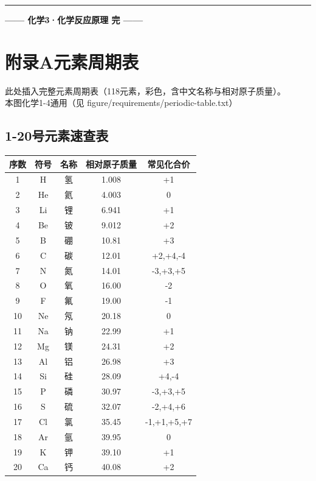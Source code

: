 \documentclass[a4paper,12pt]{ctexart}
\begin{document}
\vspace{0.5cm}
\begin{center}\rule{0.7\textwidth}{1pt}\vspace{0.4cm}
{\large\textcolor{blue!70!black}{\textbf{—— 化学3·化学反应原理 完 ——}}}
\end{center}

\newpage

\appendix
\section*{\textcolor{blue!70!black}{附录A\quad 元素周期表}}

\begin{figplaceholder}
此处插入完整元素周期表（118元素，彩色，含中文名称与相对原子质量）。\\
本图化学1-4通用（见 figure/requirements/periodic-table.txt）
\end{figplaceholder}

\subsection*{1-20号元素速查表}

\begin{center}
\begin{tabular}{|c|c|c|c|c|}
\hline
\textbf{序数} & \textbf{符号} & \textbf{名称} & \textbf{相对原子质量} & \textbf{常见化合价} \\
\hline
1 & H & 氢 & 1.008 & +1 \\
2 & He & 氦 & 4.003 & 0 \\
3 & Li & 锂 & 6.941 & +1 \\
4 & Be & 铍 & 9.012 & +2 \\
5 & B & 硼 & 10.81 & +3 \\
6 & C & 碳 & 12.01 & +2,+4,-4 \\
7 & N & 氮 & 14.01 & -3,+3,+5 \\
8 & O & 氧 & 16.00 & -2 \\
9 & F & 氟 & 19.00 & -1 \\
10 & Ne & 氖 & 20.18 & 0 \\
11 & Na & 钠 & 22.99 & +1 \\
12 & Mg & 镁 & 24.31 & +2 \\
13 & Al & 铝 & 26.98 & +3 \\
14 & Si & 硅 & 28.09 & +4,-4 \\
15 & P & 磷 & 30.97 & -3,+3,+5 \\
16 & S & 硫 & 32.07 & -2,+4,+6 \\
17 & Cl & 氯 & 35.45 & -1,+1,+5,+7 \\
18 & Ar & 氩 & 39.95 & 0 \\
19 & K & 钾 & 39.10 & +1 \\
20 & Ca & 钙 & 40.08 & +2 \\
\hline
\end{tabular}
\end{center}
\end{document}
